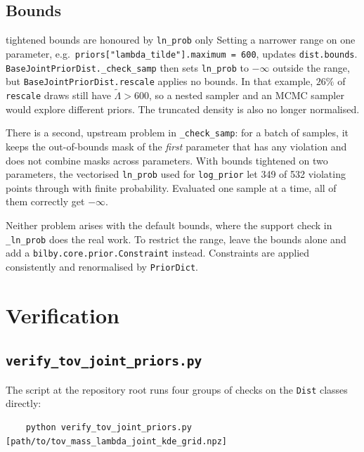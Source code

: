 \documentclass[11pt,a4paper]{article}
\newcommand{\lt}{\tilde{\Lambda}}
\newcommand{\code}[1]{\texttt{#1}}
\begin{document}
\subsection{Bounds}

\begin{caveat}{tightened bounds are honoured by \code{ln\_prob} only}
Setting a narrower range on one parameter, e.g.\
\code{priors["lambda\_tilde"].maximum = 600}, updates \code{dist.bounds}.
\code{BaseJointPriorDist.\_check\_samp} then sets \code{ln\_prob} to $-\infty$
outside the range, but \code{BaseJointPriorDist.rescale} applies no bounds. In
that example, $26\%$ of \code{rescale} draws still have $\lt > 600$, so a nested
sampler and an MCMC sampler would explore different priors. The truncated
density is also no longer normalised.

There is a second, upstream problem in \code{\_check\_samp}: for a batch of
samples, it keeps the out-of-bounds mask of the \emph{first} parameter that has
any violation and does not combine masks across parameters. With bounds
tightened on two parameters, the vectorised \code{ln\_prob} used for
\code{log\_prior} let 349 of 532 violating points through with finite
probability. Evaluated one sample at a time, all of them correctly get
$-\infty$.

Neither problem arises with the default bounds, where the support check in
\code{\_ln\_prob} does the real work. To restrict the range, leave the bounds
alone and add a \code{bilby.core.prior.Constraint} instead. Constraints are
applied consistently and renormalised by \code{PriorDict}.
\end{caveat}

\section{Verification}
\label{sec:verify}

\subsection{\code{verify\_tov\_joint\_priors.py}}

The script at the repository root runs four groups of checks on the
\code{Dist} classes directly:
\begin{verbatim}
    python verify_tov_joint_priors.py [path/to/tov_mass_lambda_joint_kde_grid.npz]
\end{verbatim}
\end{document}
